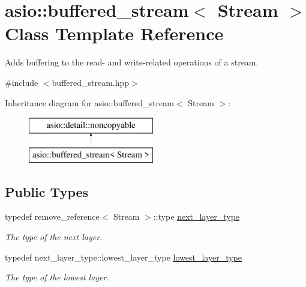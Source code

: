\hypertarget{classasio_1_1buffered__stream}{}\section{asio\+:\+:buffered\+\_\+stream$<$ Stream $>$ Class Template Reference}
\label{classasio_1_1buffered__stream}


Adds buffering to the read-\/ and write-\/related operations of a stream.  




{\ttfamily \#include $<$buffered\+\_\+stream.\+hpp$>$}

Inheritance diagram for asio\+:\+:buffered\+\_\+stream$<$ Stream $>$\+:\begin{figure}[H]
\begin{center}
\leavevmode
\includegraphics[height=2.000000cm]{classasio_1_1buffered__stream}
\end{center}
\end{figure}
\subsection*{Public Types}
\begin{DoxyCompactItemize}
\item 
typedef remove\+\_\+reference$<$ Stream $>$\+::type \hyperlink{classasio_1_1buffered__stream_acde0aacfaa4ec31697fe87ae83704af1}{next\+\_\+layer\+\_\+type}
\begin{DoxyCompactList}\small\item\em The type of the next layer. \end{DoxyCompactList}\item 
typedef next\+\_\+layer\+\_\+type\+::lowest\+\_\+layer\+\_\+type \hyperlink{classasio_1_1buffered__stream_aed77dcc210c8f8bc905715340a498bc2}{lowest\+\_\+layer\+\_\+type}
\begin{DoxyCompactList}\small\item\em The type of the lowest layer. \end{DoxyCompactList}\end{DoxyCompactItemize}
